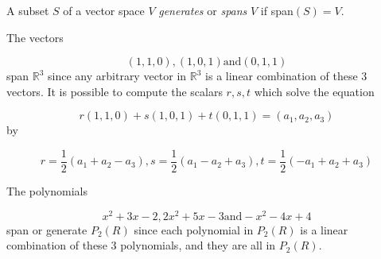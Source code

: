 \begin{definition}
		A subset \(S\) of a vector space \(V\) \textit{generates} or \textit{spans} \(V\) if span\((S) = V\).

\end{definition}


\begin{example}
		The vectors

\[
(1, 1, 0), (1, 0, 1) \text{and} (0, 1, 1)
\]
		span \(\mathbb{R}^{3}\) since any arbitrary vector in \(\mathbb{R}^{3}\) is a linear combination of these 3 vectors. It is possible to compute the scalars \(r,s,t\) which solve the equation

\[
r(1, 1, 0) + s(1, 0, 1) + t(0, 1, 1) = (a_{1}, a_{2}, a_{3})
\]
		by

\[
r = \frac{1}{2}(a_{1} + a_{2} - a_{3}), s = \frac{1}{2}(a_{1} - a_{2} + a_{3}), t = \frac{1}{2}(-a_{1} + a_{2} + a_{3})
\]

\end{example}


\begin{example}
		The polynomials

\[
x^{2} + 3x - 2, 2x^{2} + 5x - 3 \text{and} -x^{2} - 4x + 4
\]
		span or generate \(P_{2}(R)\) since each polynomial in \(P_{2}(R)\) is a linear combination of these 3 polynomials, and they are all in \(P_{2}(R)\).

\end{example}